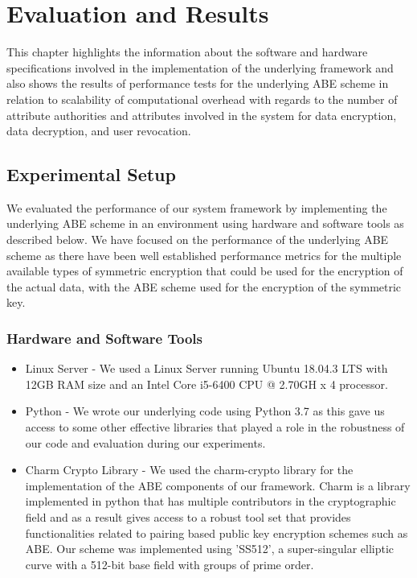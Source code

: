 \chapter{Evaluation and Results}
\label{chap:evaluation_and_results}

This chapter highlights the information about the software and hardware specifications involved in the implementation of the underlying framework and also shows the results of performance tests for the underlying ABE scheme in relation to scalability of computational overhead with regards to the number of attribute authorities and attributes involved in the system for data encryption, data decryption, and user revocation.

\section{Experimental Setup}

We evaluated the performance of our system framework by implementing the underlying ABE scheme in an environment using hardware and software tools as described below. We have focused on the performance of the underlying ABE scheme as there have been well established performance metrics for the multiple available types of symmetric encryption that could be used for the encryption of the actual data, with the ABE scheme used for the encryption of the symmetric key. 

\subsection{Hardware and Software Tools}
\begin{itemize}
	\item Linux Server - We used a Linux Server running Ubuntu 18.04.3 LTS with 12GB RAM size and an Intel Core i5-6400 CPU @ 2.70GH x 4 processor.
	
	\item Python - We wrote our underlying code using Python 3.7 as this gave us access to some other effective libraries that played a role in the robustness of our code and evaluation during our experiments.
	
	\item Charm Crypto Library\cite{charm13crypto} - We used the charm-crypto library for the implementation of the ABE components of our framework. Charm is a library implemented in python that has multiple contributors in the cryptographic field and as a result gives access to a robust tool set that provides functionalities related to pairing based public key encryption schemes such as ABE. Our scheme was implemented using 'SS512', a super-singular elliptic curve with a 512-bit base field with groups of prime order.
\end{itemize}

